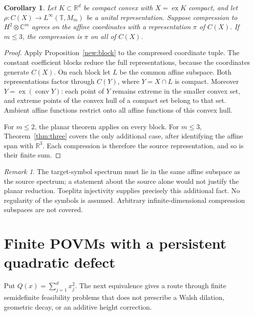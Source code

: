\documentclass[11pt,letterpaper]{amsart}
\newtheorem{corollary}[theorem]{Corollary}
\theoremstyle{definition}
\theoremstyle{remark}
\newtheorem{remark}[theorem]{Remark}
\numberwithin{equation}{section}
\DeclareMathOperator{\ex}{ex}
\newcommand{\R}{\mathbb R}
\newcommand{\C}{\mathbb C}
\begin{document}
\begin{corollary}\label{new:hardy}
Let $K\subset\R^d$ be compact convex with $X=\ex K$ compact, and let
$\rho:C(X)\to L^\infty(\mathbb T,M_m)$ be a unital representation.
Suppose compression to $H^2\otimes\C^m$ agrees on the affine coordinates
with a representation $\pi$ of $C(X)$. If $m\le3$, the compression is $\pi$ on all of $C(X)$.
\end{corollary}
\begin{proof}
Apply Proposition~\ref{new:block} to the compressed coordinate tuple.
The constant coefficient blocks reduce the full representations,
because the coordinates generate $C(X)$. On each block let $L$ be the
common affine subspace. Both representations factor through
$C(Y)$, where $Y=X\cap L$ is compact. Moreover
$Y=\ex(\operatorname{conv}Y)$: each point of $Y$ remains extreme in
the smaller convex set, and extreme points of the convex hull of a
compact set belong to that set. Ambient affine functions restrict onto
all affine functions of this convex hull.

For $m\le2$, the planar theorem applies on every block. For $m\le3$,
Theorem~\ref{thm:three} covers the only additional case,
after identifying the affine span with $\R^3$. Each compression is
therefore the source representation, and so is their finite sum.
\end{proof}

\begin{remark}
The target-symbol spectrum must lie in the same affine subspace as the
source spectrum; a statement about the source alone would not justify
the planar reduction. Toeplitz injectivity supplies precisely this
additional fact. No regularity of the symbols is assumed. Arbitrary
infinite-dimensional compression subspaces are not covered.
\end{remark}

\section{Finite POVMs with a persistent quadratic defect}

Put $Q(x)=\sum_{j=1}^d x_j^2$. The next equivalence gives a route through
finite semidefinite feasibility problems that does not prescribe a Walsh
dilation, geometric decay, or an additive height correction.
\end{document}
